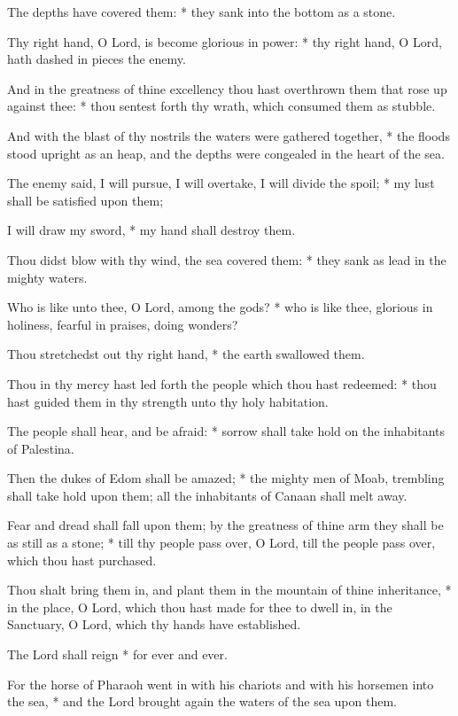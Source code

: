 \begin{multicols}{2}
The depths have covered them: * they sank into the bottom as a stone.\par
Thy right hand, O Lord, is become glorious in power: * thy right hand, O Lord, hath dashed in pieces the enemy.\par
And in the greatness of thine excellency {\dag} thou hast overthrown them that rose up against thee: * thou sentest forth thy wrath, which consumed them as stubble.\par
And with the blast of thy nostrils the waters were gathered together, * the floods stood upright as an heap, and the depths were congealed in the heart of the sea.\par
The enemy said, {\dag} I will pursue, I will overtake, I will divide the spoil; * my lust shall be satisfied upon them;\par
I will draw my sword, * my hand shall destroy them.\par
Thou didst blow with thy wind, the sea covered them: * they sank as lead in the mighty waters.\par
Who is like unto thee, O Lord, among the gods? * who is like thee, glorious in holiness, fearful in praises, doing wonders?\par
Thou stretchedst out thy right hand, * the earth swallowed them.\par
Thou in thy mercy hast led forth the people which thou hast redeemed: * thou hast guided them in thy strength unto thy holy habitation.\par
The people shall hear, and be afraid: * sorrow shall take hold on the inhabitants of Palestina.\par
Then the dukes of Edom shall be amazed; * the mighty men of Moab, trembling shall take hold upon them; all the inhabitants of Canaan shall melt away.\par
Fear and dread shall fall upon them; {\dag} by the greatness of thine arm they shall be as still as a stone; * till thy people pass over, O Lord, till the people pass over, which thou hast purchased.\par
Thou shalt bring them in, and plant them in the mountain of thine inheritance, * in the place, O Lord, which thou hast made for thee to dwell in, in the Sanctuary, O Lord, which thy hands have established.\par
The Lord shall reign * for ever and ever.\par
For the horse of Pharaoh went in with his chariots and with his horsemen into the sea, * and the Lord brought again the waters of the sea upon them.\par

\end{multicols}
